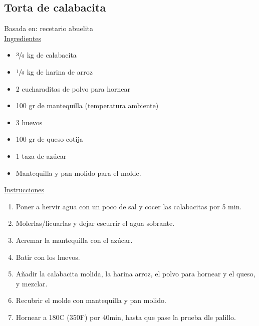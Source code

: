 \subsection{Torta de calabacita}

Basada en: recetario abuelita \\

\underline{Ingredientes}
\begin{itemize}
\item $\sfrac{3}{4}$ kg de calabacita
\item $\sfrac{1}{4}$ kg de harina de arroz
\item 2 cucharaditas de polvo para hornear
\item 100 gr de mantequilla (temperatura ambiente)
\item 3 huevos
\item 100 gr de queso cotija
\item 1 taza de azúcar
\item Mantequilla y pan molido para el molde.
\end{itemize}

\underline{Instrucciones}
\begin{enumerate}
\item Poner a hervir agua con un poco de sal y cocer las calabacitas por 5 min.
\item Molerlas/licuarlas y dejar escurrir el agua sobrante.
\item Acremar la mantequilla con el azúcar. 
\item Batir con los huevos.
\item Añadir la calabacita molida, la harina arroz, el polvo para hornear y el queso, y mezclar.
\item Recubrir el molde con mantequilla y pan molido.
\item Hornear a 180C (350F) por \Sim 40min, hasta que pase la prueba dle palillo.
\end{enumerate}
